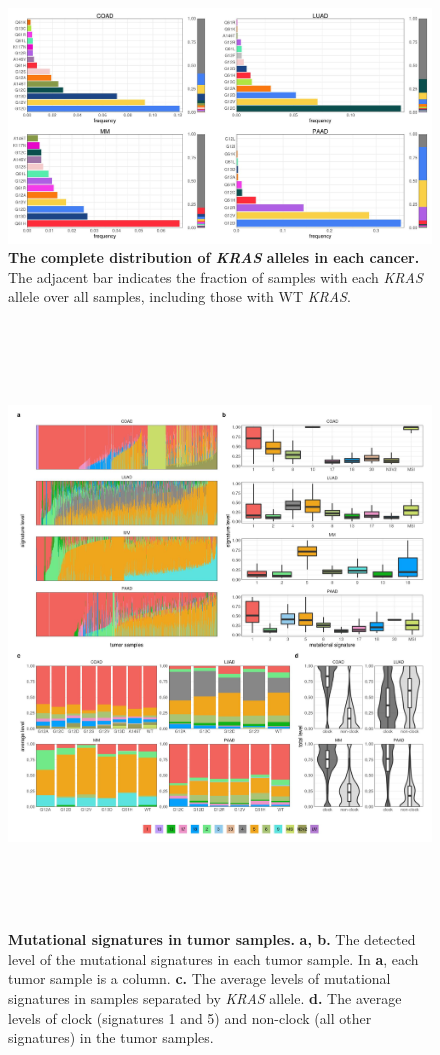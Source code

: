 \documentclass[english, 10pt, letterpaper]{article}
\newcommand{\KRAS}{\emph{KRAS}}
\begin{document}
\begin{figure}[p]
\centering
\includegraphics[width=\textwidth]{figures/SuppFigure_01.jpeg}
\caption{
    \textbf{The complete distribution of \KRAS{} alleles in each cancer.} The adjacent bar indicates the fraction of samples with each \KRAS{} allele over all samples, including those with WT \KRAS{}.
}
\label{sfig:expanded-kras-allele-distribution}
\end{figure}


\begin{figure}[p]
\centering
\includegraphics[height=160mm]{figures/SuppFigure_02.jpeg}
\caption{
    \textbf{Mutational signatures in tumor samples.}
    \textbf{a, b.} The detected level of the mutational signatures in each tumor sample. In \textbf{a}, each tumor sample is a column.
    \textbf{c.} The average levels of mutational signatures in samples separated by \KRAS{} allele.
    \textbf{d.} The average levels of clock (signatures 1 and 5) and non-clock (all other signatures) in the tumor samples.
}
\label{sfig:mutational-signatures-summary}
\end{figure}
\end{document}
